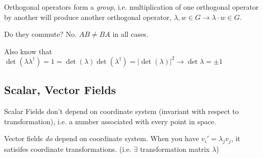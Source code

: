 \documentclass{article} \usepackage{amsmath} \usepackage{amssymb} \usepackage{amsthm} \usepackage[margin=0.2in]{geometry} \usepackage{hyperref} \usepackage{physics} \usepackage{tikz} \usepackage{mathtools} \mathtoolsset{showonlyrefs} \theoremstyle{definition} \newtheorem{theorem}{Theorem}[section] \newtheorem{corollary}{Corollary}[theorem] \newtheorem{lemma}[theorem]{Lemma} \newtheorem{definition}{Definition}[section] \author{Connor Duncan} \date{\today}
\begin{document}
Orthogonal operators form a \emph{group}, i.e. multiplication of one orthogonal operator by another will produce another orthogonal operator, $\lambda,w\in G\rightarrow \lambda\cdot w\in G$.

Do they commute? No. $AB\neq BA$ in all cases.

Also know that $\det(\lambda\lambda^\dag)=1=\det(\lambda)\det(\lambda^\dag)=|\det(\lambda)|^2\rightarrow\det\lambda=\pm 1$

\subsection{Scalar, Vector Fields}
Scalar Fields don't depend on coordinate system (invariant with respect to transformation), i.e. a number associated with every point in space.

Vector fields \emph{do} depend on coordinate system. When you have $v_i'=\lambda_jv_j$, it satisifes coordinate transformations. (i.e. $\exists$ transformation matrix $\lambda$)
\end{document}
